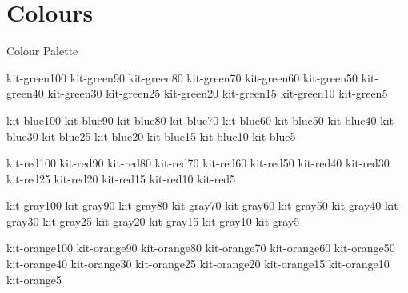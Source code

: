 \documentclass[en]{sdqbeamer}
\begin{document}
\section{Colours}
\begin{frame}{Colour Palette}
\tiny

	\colorbox{kit-green100}{kit-green100}
	\colorbox{kit-green90}{kit-green90}
	\colorbox{kit-green80}{kit-green80}
	\colorbox{kit-green70}{kit-green70}
	\colorbox{kit-green60}{kit-green60}
	\colorbox{kit-green50}{kit-green50}
	\colorbox{kit-green40}{kit-green40}
	\colorbox{kit-green30}{kit-green30}
	\colorbox{kit-green25}{kit-green25}
	\colorbox{kit-green20}{kit-green20}
	\colorbox{kit-green15}{kit-green15}
	\colorbox{kit-green10}{kit-green10}
	\colorbox{kit-green5}{kit-green5}

	\colorbox{kit-blue100}{kit-blue100}
	\colorbox{kit-blue90}{kit-blue90}
	\colorbox{kit-blue80}{kit-blue80}
	\colorbox{kit-blue70}{kit-blue70}
	\colorbox{kit-blue60}{kit-blue60}
	\colorbox{kit-blue50}{kit-blue50}
	\colorbox{kit-blue40}{kit-blue40}
	\colorbox{kit-blue30}{kit-blue30}
	\colorbox{kit-blue25}{kit-blue25}
	\colorbox{kit-blue20}{kit-blue20}
	\colorbox{kit-blue15}{kit-blue15}
	\colorbox{kit-blue10}{kit-blue10}
	\colorbox{kit-blue5}{kit-blue5}

	\colorbox{kit-red100}{kit-red100}
	\colorbox{kit-red90}{kit-red90}
	\colorbox{kit-red80}{kit-red80}
	\colorbox{kit-red70}{kit-red70}
	\colorbox{kit-red60}{kit-red60}
	\colorbox{kit-red50}{kit-red50}
	\colorbox{kit-red40}{kit-red40}
	\colorbox{kit-red30}{kit-red30}
	\colorbox{kit-red25}{kit-red25}
	\colorbox{kit-red20}{kit-red20}
	\colorbox{kit-red15}{kit-red15}
	\colorbox{kit-red10}{kit-red10}
	\colorbox{kit-red5}{kit-red5}

	\colorbox{kit-gray100}{\color{white}kit-gray100}
	\colorbox{kit-gray90}{\color{white}kit-gray90}
	\colorbox{kit-gray80}{\color{white}kit-gray80}
	\colorbox{kit-gray70}{\color{white}kit-gray70}
	\colorbox{kit-gray60}{\color{white}kit-gray60}
	\colorbox{kit-gray50}{\color{white}kit-gray50}
	\colorbox{kit-gray40}{kit-gray40}
	\colorbox{kit-gray30}{kit-gray30}
	\colorbox{kit-gray25}{kit-gray25}
	\colorbox{kit-gray20}{kit-gray20}
	\colorbox{kit-gray15}{kit-gray15}
	\colorbox{kit-gray10}{kit-gray10}
	\colorbox{kit-gray5}{kit-gray5}

	\colorbox{kit-orange100}{kit-orange100}
	\colorbox{kit-orange90}{kit-orange90}
	\colorbox{kit-orange80}{kit-orange80}
	\colorbox{kit-orange70}{kit-orange70}
	\colorbox{kit-orange60}{kit-orange60}
	\colorbox{kit-orange50}{kit-orange50}
	\colorbox{kit-orange40}{kit-orange40}
	\colorbox{kit-orange30}{kit-orange30}
	\colorbox{kit-orange25}{kit-orange25}
	\colorbox{kit-orange20}{kit-orange20}
	\colorbox{kit-orange15}{kit-orange15}
	\colorbox{kit-orange10}{kit-orange10}
	\colorbox{kit-orange5}{kit-orange5}


\end{frame}
\end{document}
